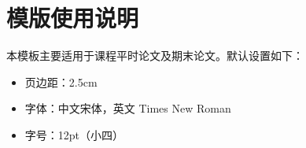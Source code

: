 \documentclass[12pt,hyperref,a4paper,UTF8,fontset=fandol]{ctexart}
\begin{document}
\cover
\newpage

\setcounter{page}{1}

\begin{abstract}
    本文档旨在作为一份使用指南...（此处省略）...
\end{abstract}


\newpage
\tableofcontents

\newpage


\thispagestyle{firstpage}

\setcounter{page}{1} 

\thispagestyle{firstpage} 

\section{模版使用说明}
本模板主要适用于课程平时论文及期末论文。默认设置如下：
\begin{itemize}
    \item 页边距：2.5cm
    \item 字体：中文宋体，英文 Times New Roman
    \item 字号：12pt（小四）
\end{itemize}
\end{document}
